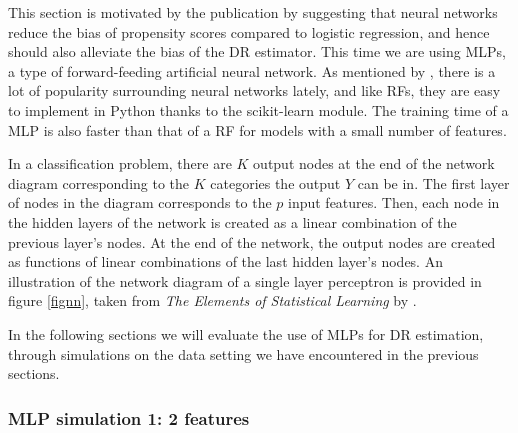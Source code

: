 \documentclass[12pt,twoside]{article}
\begin{document}
This section is motivated by the publication by \citet{setoguchi-nn} suggesting that neural networks reduce the bias of propensity scores compared to logistic regression, and hence should also alleviate the bias of the DR estimator. This time we are using MLPs, a type of forward-feeding artificial neural network. As mentioned by \citet{hastieESL}, there is a lot of popularity surrounding neural networks lately, and like RFs, they are easy to implement in Python thanks to the scikit-learn module. The training time of a MLP is also faster than that of a RF for models with a small number of features. 

In a classification problem, there are $K$ output nodes at the end of the network diagram corresponding to the $K$ categories the output $Y$ can be in. The first layer of nodes in the diagram corresponds to the $p$ input features. Then, each node in the hidden layers of the network is created as a linear combination of the previous layer's nodes. At the end of the network, the output nodes are created as functions of linear combinations of the last hidden layer's nodes. An illustration of the network diagram of a single layer perceptron is provided in figure \ref{fignn}, taken from \textit{The Elements of Statistical Learning} by \citet{hastieESL}.

In the following sections we will evaluate the use of MLPs for DR estimation, through simulations on the data setting we have encountered in the previous sections.

\subsubsection{MLP simulation 1: 2 features}
\end{document}
